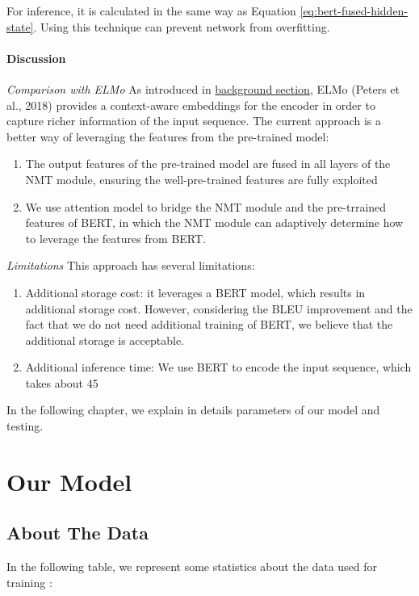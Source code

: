 \documentclass{report}
\begin{document}
    For inference, it is calculated in the same way as Equation \ref{eq:bert-fused-hidden-state}. Using this technique can prevent network from overfitting.

\subsubsection{Discussion}
\label{sssec:bert-fused-discussion}
\textit{Comparison with ELMo}
As introduced in \hyperref[sec:nmt-background]{background section}, ELMo (Peters et al., 2018) provides a context-aware embeddings for the encoder in order to capture richer information of the input sequence. The current approach is a better way of leveraging the features from the pre-trained model:
\begin{enumerate}
	\item The output features of the pre-trained model are fused in all layers of the NMT module, ensuring the well-pre-trained features are fully exploited
	\item We use attention model to bridge the NMT module and the pre-trrained features of BERT, in which the NMT module can adaptively determine how to leverage the features from BERT.
	
\end{enumerate}

\textit{Limitations}
This approach has several limitations:
\begin{enumerate}
	\item Additional storage cost: it leverages a BERT model, which results in additional storage cost. However, considering the BLEU improvement and the fact that we do not need additional training of BERT, we believe that the additional storage is acceptable.
	\item Additional inference time: We use BERT to encode the input sequence, which takes about 45%
\end{enumerate}

In the following chapter, we explain in details parameters of our model and testing.

\chapter{Our Model}
\label{ch:our-model}

\section{About The Data}
\label{sec:about-the-data}
In the following table, we represent some statistics about the data used for training :
\end{document}
